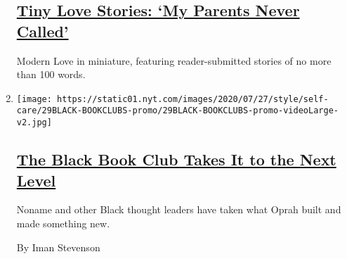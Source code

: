 \begin{enumerate}
{  \subsection{\texorpdfstring{\href{/2020/07/28/style/tiny-modern-love-stories-coronavirus-my-parents-never-called.html}{Tiny
  Love Stories: `My Parents Never
  Called'}}{Tiny Love Stories: `My Parents Never Called'}}\label{tiny-love-stories-my-parents-never-called}}

  Modern Love in miniature, featuring reader-submitted stories of no
  more than 100 words.
\item
  \texttt{[image: https://static01.nyt.com/images/2020/07/27/style/self-care/29BLACK-BOOKCLUBS-promo/29BLACK-BOOKCLUBS-promo-videoLarge-v2.jpg]}

  \hypertarget{the-black-book-club-takes-it-to-the-next-level}{%
  \subsection{\texorpdfstring{\href{/2020/07/29/style/self-care/black-book-clubs.html}{The
  Black Book Club Takes It to the Next
  Level}}{The Black Book Club Takes It to the Next Level}}\label{the-black-book-club-takes-it-to-the-next-level}}

  Noname and other Black thought leaders have taken what Oprah built and
  made something new.

  By Iman Stevenson
\end{enumerate}

